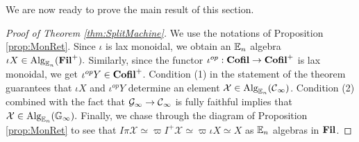 We are now ready to prove the main result of this section.

\begin{proof}[Proof of Theorem \ref{thm:SplitMachine}]
We use the notations of Proposition \ref{prop:MonRet}.  Since $\iota$ is lax monoidal, we obtain an $\operatorname{\mathbb{E}}_n$ algebra $\iota X \in \operatorname{\text{Alg}}_{\operatorname{\mathbb{E}}_n}(\operatorname{\textbf{Fil}}^+).$  
Similarly, since the functor $\iota^{op}: \operatorname{\textbf{Cofil}} \to \operatorname{\textbf{Cofil}}^+$ is lax monoidal, we get $\iota^{op}Y \in \operatorname{\textbf{Cofil}}^+$.  %
Condition (1) in the statement of the theorem guarantees that $\iota X$ and $\iota^{op}Y$ determine an element $\mathcal{X} \in \operatorname{\text{Alg}}_{\operatorname{\mathbb{E}}_n}(\operatorname{\mathcal{C}}_{\infty})$.  Condition (2) combined with the fact that $\mathcal{G}_\infty \to \operatorname{\mathcal{C}}_\infty$ is fully faithful implies that $\mathcal{X} \in \operatorname{\text{Alg}}_{\operatorname{\mathbb{E}}_n}(\operatorname{\mathbb{G}}_\infty).$  Finally, we chase through the diagram of Proposition \ref{prop:MonRet} to see that $I\pi \mathcal{X} \simeq \varpi I^+ \mathcal{X} \simeq \varpi \iota X \simeq X$ as $\operatorname{\mathbb{E}}_n$ algebras in $\operatorname{\textbf{Fil}}$.  
\end{proof}




